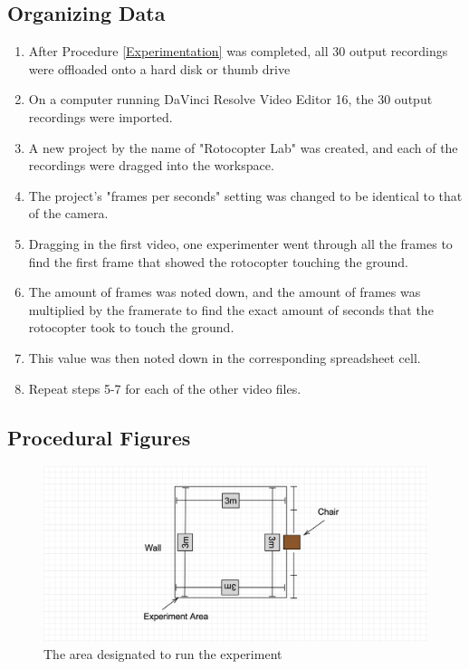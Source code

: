 \documentclass[]{article}
\theoremstyle{definition}
\begin{document}
\subsection{Organizing Data}
\begin{enumerate}
    \item After Procedure \ref{Experimentation} was completed, all 30 output recordings were offloaded onto a hard disk or thumb drive
    \item On a computer running DaVinci Resolve Video Editor 16, the 30 output recordings were imported.
    \item A new project by the name of "Rotocopter Lab" was created, and each of the recordings were dragged into the workspace.
    \item The project's "frames per seconds" setting was changed to be identical to that of the camera.
    \item Dragging in the first video, one experimenter went through all the frames to find the first frame that showed the rotocopter touching the ground.
    \item The amount of frames was noted down, and the amount of frames was multiplied by the framerate to find the exact amount of seconds that the rotocopter took to touch the ground.
    \item This value was then noted down in the corresponding spreadsheet cell.
    \item Repeat steps 5-7 for each of the other video files.
\end{enumerate}

\subsection{Procedural Figures}
\begin{figure}[H]
    \centering
    \includegraphics[scale=0.10]{graphics/experiment-diagram.png}
    \caption{The area designated to run the experiment}
    \label{Experiment}
\end{figure}
\end{document}
